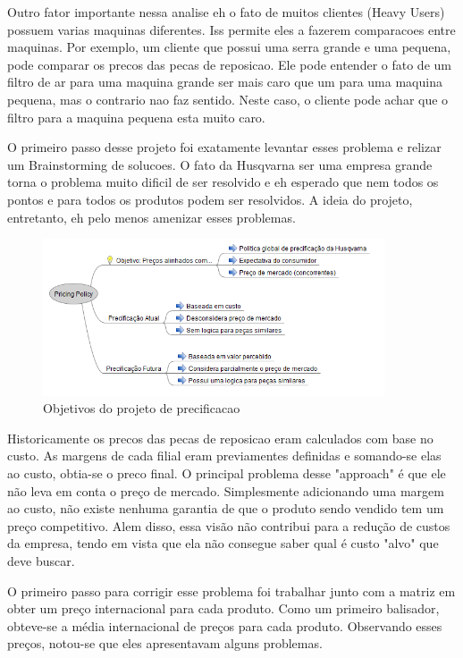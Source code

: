 \documentclass[12pt]{article}
\begin{document}
	Outro fator importante nessa analise eh o fato de muitos clientes (Heavy Users) possuem varias maquinas diferentes. Iss permite eles a fazerem comparacoes entre maquinas. Por exemplo, um cliente que possui uma serra grande e uma pequena, pode comparar os precos das pecas de reposicao. Ele pode entender o fato de um filtro de ar para uma maquina grande ser mais caro que um para uma maquina pequena, mas o contrario nao faz sentido. Neste caso, o cliente pode achar que o filtro para a maquina pequena esta muito caro.

	O primeiro passo desse projeto foi exatamente levantar esses problema e relizar um Brainstorming de solucoes. O fato da Husqvarna ser uma empresa grande torna o problema muito dificil de ser resolvido e eh esperado que nem todos os pontos e para todos os produtos podem ser resolvidos. A ideia do projeto, entretanto, eh pelo menos amenizar esses problemas.

\begin{figure}[h!]
	\centering
	\includegraphics[width=0.9\textwidth]{img/pricing.png}
	\caption{Objetivos do projeto de precificacao}
	\label{pricing}
\end{figure}

	Historicamente os precos das pecas de reposicao eram calculados com base no custo. As margens de cada filial eram previamentes definidas e somando-se elas ao custo, obtia-se o preco final. O principal problema desse "approach" é que ele não leva em conta o preço de mercado. Simplesmente adicionando uma margem ao custo, não existe nenhuma garantia de que o produto sendo vendido tem um preço competitivo. Alem disso, essa visão não contribui para a redução de custos da empresa, tendo em vista que ela não consegue saber qual é custo "alvo" que deve buscar.

	O primeiro passo para corrigir esse problema foi trabalhar junto com a matriz em obter um preço internacional para cada produto. Como um primeiro balisador, obteve-se a média internacional de preços para cada produto. Observando esses preços, notou-se que eles apresentavam alguns problemas. 
\end{document}
